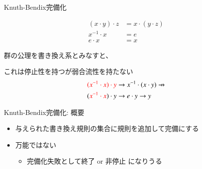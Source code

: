 \documentclass[dvipdfmx,11pt,notheorems]{beamer}
\theoremstyle{definition}
\newcommand{\red}[1]{{\color{red} #1}}
\begin{document}
\begin{frame}{Knuth-Bendix完備化}
  \begin{wrapfigure}{r}{0.4\textwidth}
    \vspace{-20pt}
    \begin{screen}
      \vspace{-15pt}
      \begin{align*}
        (x \cdot y) \cdot z &= x \cdot (y \cdot z) \\
        x^{-1} \cdot x &= e \\
        e \cdot x &= x
      \end{align*}
    \end{screen}
  \end{wrapfigure}
  群の公理を書き換え系とみなすと、

  これは停止性を持つが弱合流性を持たない
  \begin{align*}
    \red{(x^{-1}\cdot x) \cdot y} &\rightarrow x^{-1} \cdot (x \cdot y) \not\rightarrow \\
    (\red{x^{-1}\cdot x}) \cdot y &\rightarrow e \cdot y \rightarrow y
  \end{align*}

  \pause
  \begin{block}{Knuth-Bendix完備化: 概要}
    \begin{itemize}
      \item 与えられた書き換え規則の集合に規則を追加して完備にする
      \item 万能ではない
      \begin{itemize}
        \item 完備化失敗として終了 or 非停止 になりうる
      \end{itemize}
    \end{itemize}
  \end{block}

\end{frame}
\end{document}
